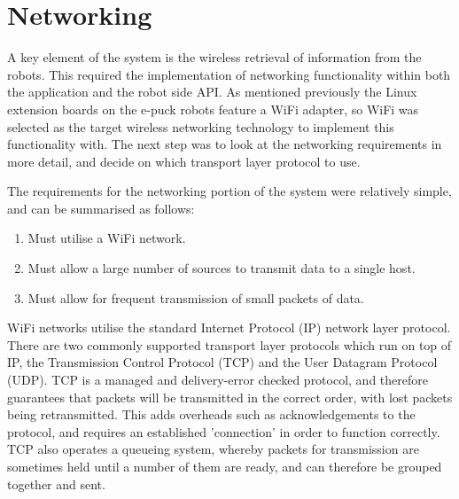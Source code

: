 
\section{Networking} \label{Networking}
A key element of the system is the wireless retrieval of information from the robots. This required the implementation of networking functionality within both the application and the robot side API. As mentioned previously the Linux extension boards on the e-puck robots feature a WiFi adapter, so WiFi was selected as the target wireless networking technology to implement this functionality with. The next step was to look at the networking requirements in more detail, and decide on which transport layer protocol to use.

The requirements for the networking portion of the system were relatively simple, and can be summarised as follows:

\begin{enumerate}
	\item Must utilise a WiFi network.
	\item Must allow a large number of sources to transmit data to a single host.
	\item Must allow for frequent transmission of small packets of data.
\end{enumerate}

WiFi networks utilise the standard Internet Protocol (IP) \cite{TCPIP} network layer protocol. There are two commonly supported transport layer protocols which run on top of IP, the Transmission Control Protocol (TCP) and the User Datagram Protocol (UDP). TCP is a managed and delivery-error checked protocol, and therefore guarantees that packets will be transmitted in the correct order, with lost packets being retransmitted. This adds overheads such as acknowledgements to the protocol, and requires an established 'connection' in order to function correctly. TCP also operates a queueing system, whereby packets for transmission are sometimes held until a number of them are ready, and can therefore be grouped together and sent. 

